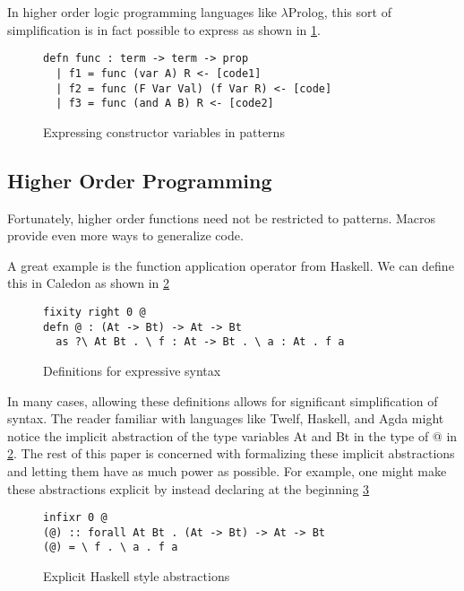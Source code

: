 In higher order logic programming languages like $\lambda$Prolog, this sort of simplification 
is in fact possible to express as shown in \ref{code:lprolog}.

\begin{figure}[H]
\begin{lstlisting}
defn func : term -> term -> prop 
  | f1 = func (var A) R <- [code1]
  | f2 = func (F Var Val) (f Var R) <- [code]
  | f3 = func (and A B) R <- [code2]
\end{lstlisting}
\caption{Expressing constructor variables in patterns}
\label{code:lprolog}
\end{figure}

\FloatBarrier
\subsection{Higher Order Programming}

Fortunately, higher order functions need not be restricted to patterns.  Macros provide even more ways to generalize code. 

A great example is the function application operator from Haskell.  
We can define this in Caledon as shown in \ref{code:macros}

\begin{figure}[H]
\begin{lstlisting}
fixity right 0 @
defn @ : (At -> Bt) -> At -> Bt
  as ?\ At Bt . \ f : At -> Bt . \ a : At . f a

\end{lstlisting}
\caption{Definitions for expressive syntax}
\label{code:macros}
\end{figure}

In many cases, allowing these definitions allows for significant simplification of syntax.
The reader familiar with languages like Twelf, Haskell, and Agda might notice the 
implicit abstraction of the type variables At and Bt in the type of @ in \ref{code:macros}. The rest of this
paper is concerned with formalizing these implicit abstractions and letting them have
as much power as possible. For example, one might make these abstractions explicit by
instead declaring at the beginning \ref{code:expHask}

\begin{figure}[H]
\begin{lstlisting}
infixr 0 @
(@) :: forall At Bt . (At -> Bt) -> At -> Bt
(@) = \ f . \ a . f a
\end{lstlisting}
\caption{Explicit Haskell style abstractions}
\label{code:expHask}
\end{figure}


